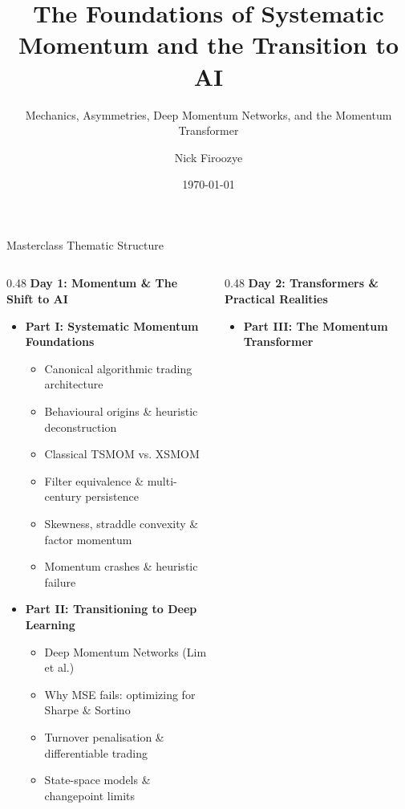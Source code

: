 \documentclass[10pt]{beamer}
\title[Momentum Foundations \& The Momentum Transformer]{The Foundations of Systematic Momentum and the Transition to AI}
\subtitle{Mechanics, Asymmetries, Deep Momentum Networks, and the Momentum Transformer}
\author[Nick Firoozye]{Nick Firoozye}
\institute{UCL Computer Science \& Financial Computing}
\date{\today}
\begin{document}
\begin{frame}
  \titlepage
\end{frame}

\begin{frame}{Masterclass Thematic Structure}
  \begin{columns}[t]
    \begin{column}{0.48\textwidth}
      \textbf{Day 1: Momentum \& The Shift to AI}
      \begin{itemize}\scriptsize
        \item \textbf{Part I: Systematic Momentum Foundations}
        \begin{itemize}\tiny
          \item Canonical algorithmic trading architecture
          \item Behavioural origins \& heuristic deconstruction
          \item Classical TSMOM vs. XSMOM
          \item Filter equivalence \& multi-century persistence
          \item Skewness, straddle convexity \& factor momentum
          \item Momentum crashes \& heuristic failure
        \end{itemize}
        \item \textbf{Part II: Transitioning to Deep Learning}
        \begin{itemize}\tiny
          \item Deep Momentum Networks (Lim et al.)
          \item Why MSE fails: optimizing for Sharpe \& Sortino
          \item Turnover penalisation \& differentiable trading
          \item State-space models \& changepoint limits
        \end{itemize}
      \end{itemize}
    \end{column}
    \begin{column}{0.48\textwidth}
      \textbf{Day 2: Transformers \& Practical Realities}
      \begin{itemize}\scriptsize
        \item \textbf{Part III: The Momentum Transformer}

\end{itemize}
\end{column}
\end{columns}
\end{frame}
\end{document}
